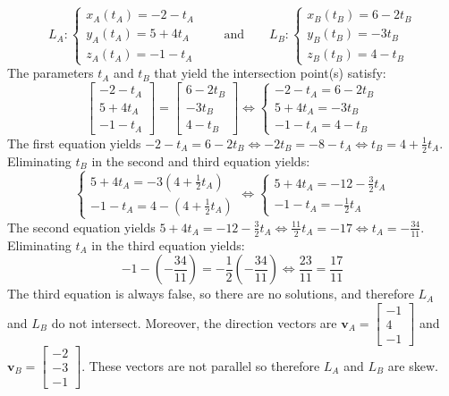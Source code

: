 \documentclass{article}
\begin{document}
\begin{itemize}
\[L_A : \left\{\begin{array}{l}
x_A(t_A) = -2 - t_A \\ 
y_A(t_A) = 5 + 4t_A \\ 
z_A(t_A) = -1 - t_A
\end{array}\right.
\quad\quad\text{and}\quad\quad 
L_B : \left\{\begin{array}{l}
x_B(t_B) = 6 - 2t_B \\ 
y_B(t_B) = -3t_B \\ 
z_B(t_B) = 4 - t_B 
\end{array}\right.\]
The parameters \(t_A\) and \(t_B\) that yield the intersection point(s) satisfy:
\[\begin{bmatrix}
-2 - t_A \\ 
5 + 4t_A \\ 
-1 - t_A 
\end{bmatrix} = \begin{bmatrix} 
6 - 2t_B \\ 
-3t_B \\ 
4 - t_B
\end{bmatrix} \iff 
\left\{\begin{array}{l}
-2 - t_A = 6 - 2t_B \\ 
5 + 4t_A = -3t_B \\ 
-1 - t_A = 4 - t_B
\end{array}\right.\]
The first equation yields \(-2 - t_A = 6 - 2t_B \iff -2t_B = -8 - t_A \iff t_B = 4 + \frac{1}{2}t_A\). Eliminating \(t_B\) in the second and third equation yields:
\[\left\{\begin{array}{l}
5 + 4t_A = -3(4 + \frac{1}{2}t_A) \\ 
-1 - t_A = 4 - (4 + \frac{1}{2}t_A)
\end{array}\right. \iff \left\{\begin{array}{l}
5 + 4t_A = -12 - \frac{3}{2}t_A \\ 
-1 - t_A = -\frac{1}{2}t_A
\end{array}\right.\]
The second equation yields \(5 + 4t_A = -12 - \frac{3}{2}t_A \iff \frac{11}{2}t_A = -17 \iff t_A = -\frac{34}{11}\). Eliminating \(t_A\) in the third equation yields: 
\[-1 - (-\frac{34}{11}) = -\frac{1}{2}(-\frac{34}{11}) \iff \frac{23}{11} = \frac{17}{11}\]
The third equation is always false, so there are no solutions, and therefore \(L_A\) and \(L_B\) do not intersect. Moreover, the direction vectors are \(\mathbf{v}_A = \begin{bmatrix} -1 \\ 4 \\ -1 \end{bmatrix}\) and \(\mathbf{v}_B = \begin{bmatrix} -2 \\ -3 \\ -1 \end{bmatrix}\). These vectors are not parallel so therefore \(L_A\) and \(L_B\) are skew.
\end{itemize}
\end{document}
